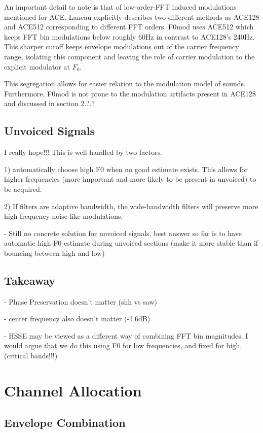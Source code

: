 \documentclass [11pt, proquest] {uwthesis}[2015/03/03]
\begin{document}
An important detail to note is that of low-order-FFT induced modulations mentioned for ACE.  Laneau explicitly describes two different methods as ACE128 and ACE512 corresponding to different FFT orders.  F0mod uses ACE512 which keeps FFT bin modulations below roughly 60Hz in contrast to ACE128's 240Hz.  This sharper cutoff keeps envelope modulations out of the carrier frequency range, isolating this component and leaving the role of carrier modulation to the explicit modulator at $F_0$.

This segregation allows for easier relation to the modulation model of sounds.  Furthermore, F0mod is not prone to the modulation artifacts present in ACE128 and discussed in section 2.?.?


\subsection{Unvoiced Signals}

I really hope!!!  This is well handled by two factors.

1) automatically choose high F0 when no good estimate exists.  This allows for higher frequencies (more important and more likely to be present in unvoiced) to be acquired.

2) If filters are adaptive bandwidth, the wide-bandwidth filters will preserve more high-frequency noise-like modulations.


 - Still no concrete solution for unvoiced signals, best answer so far is to have automatic high-F0 estimate during unvoiced sections (make it more stable than if bouncing between high and low)

\subsection{Takeaway}

 - Phase Preservation doesn't matter (shh vs saw)
 
 - center frequency also doesn't matter (-1.6dB)
 
 - HSSE may be viewed as a different way of combining FFT bin magnitudes.  I would argue that we do this using F0 for low frequencies, and fixed for high.  (critical bands!!!)

\section{Channel Allocation}

\subsection{Envelope Combination}
\end{document}
